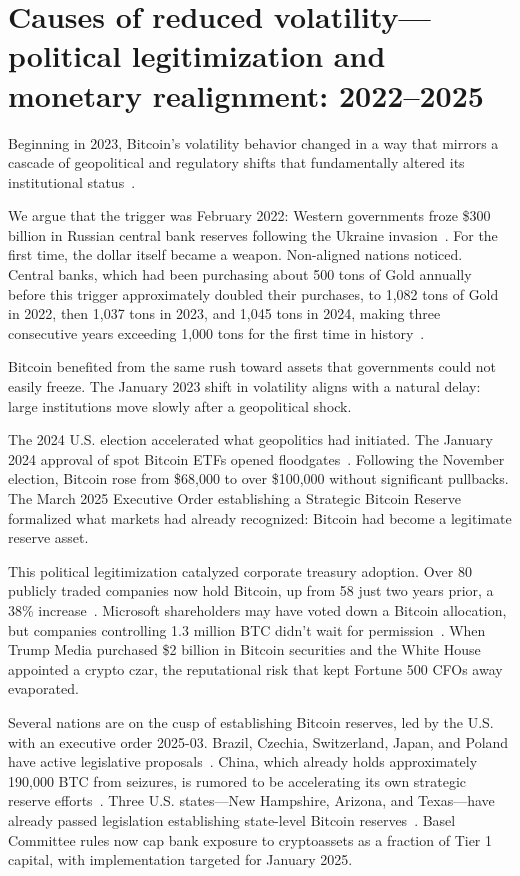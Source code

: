 \documentclass[11pt,letterpaper]{article}
\begin{document}
\section{Causes of reduced volatility---political legitimization and monetary realignment: 2022--2025}

Beginning in 2023, Bitcoin's volatility behavior changed in a way that mirrors a cascade of geopolitical and regulatory shifts that fundamentally altered its institutional status~\cite{shore2025}.

We argue that the trigger was February 2022: Western governments froze \$300 billion in Russian central bank reserves following the Ukraine invasion~\cite{cnbc2022}. For the first time, the dollar itself became a weapon. Non-aligned nations noticed. Central banks, which had been purchasing about 500 tons of Gold annually before this trigger approximately doubled their purchases, to  1,082 tons of Gold in 2022, then 1,037 tons in 2023, and 1,045 tons in 2024, making three consecutive years exceeding 1,000 tons for the first time in history~\cite{wgc2025demand}.

Bitcoin benefited from the same rush toward assets that governments could not easily freeze. The January 2023 shift in volatility aligns with a natural delay: large institutions move slowly after a geopolitical shock.

The 2024 U.S. election accelerated what geopolitics had initiated. The January 2024 approval of spot Bitcoin ETFs opened floodgates~\cite{sec2024}. Following the November election, Bitcoin rose from \$68,000 to over \$100,000 without significant pullbacks. The March 2025 Executive Order establishing a Strategic Bitcoin Reserve formalized what markets had already recognized: Bitcoin had become a legitimate reserve asset.

This political legitimization catalyzed corporate treasury adoption. Over 80 publicly traded companies now hold Bitcoin, up from 58 just two years prior, a 38\% increase~\cite{coindesk2025}. Microsoft shareholders may have voted down a Bitcoin allocation, but companies controlling 1.3 million BTC didn't wait for permission~\cite{river2025}. When Trump Media purchased \$2 billion in Bitcoin securities and the White House appointed a crypto czar, the reputational risk that kept Fortune 500 CFOs away evaporated.

Several nations are on the cusp of establishing Bitcoin reserves, led by the U.S. with an executive order 2025-03. Brazil, Czechia, Switzerland, Japan, and Poland have active legislative proposals~\cite{decrypt2024}. China, which already holds approximately 190,000 BTC from seizures, is rumored to be accelerating its own strategic reserve efforts~\cite{cryptobriefing2025}. Three U.S. states---New Hampshire, Arizona, and Texas---have already passed legislation establishing state-level Bitcoin reserves~\cite{proskauer2025}. Basel Committee rules now cap bank exposure to cryptoassets as a fraction of Tier 1 capital, with implementation targeted for January 2025.
\end{document}
